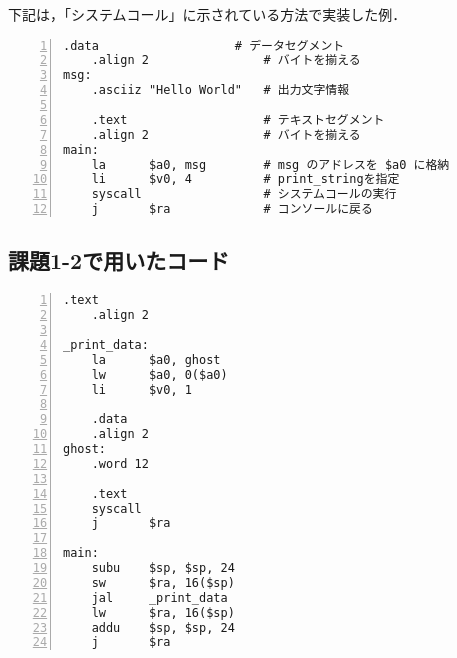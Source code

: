 下記は，「システムコール」に示されている方法で実装した例．
\begin{Verbatim}[numbers=left, xleftmargin=10mm, numbersep=6pt,
                    fontsize=\small, baselinestretch=0.8]
    .data                   # データセグメント
    .align 2                # バイトを揃える
msg:
    .asciiz "Hello World"   # 出力文字情報

    .text                   # テキストセグメント
    .align 2                # バイトを揃える
main:
    la      $a0, msg        # msg のアドレスを $a0 に格納
    li      $v0, 4          # print_stringを指定
    syscall                 # システムコールの実行
    j       $ra             # コンソールに戻る
\end{Verbatim}

\subsection{課題1-2で用いたコード} \label{sec:p1-2}
\begin{Verbatim}[numbers=left, xleftmargin=10mm, numbersep=6pt,
                    fontsize=\small, baselinestretch=0.8]
    .text
    .align 2

_print_data:
    la      $a0, ghost
    lw      $a0, 0($a0)
    li      $v0, 1

    .data
    .align 2
ghost:
    .word 12

    .text
    syscall
    j       $ra

main:
    subu    $sp, $sp, 24
    sw      $ra, 16($sp)
    jal     _print_data
    lw      $ra, 16($sp)
    addu    $sp, $sp, 24
    j       $ra
\end{Verbatim}


